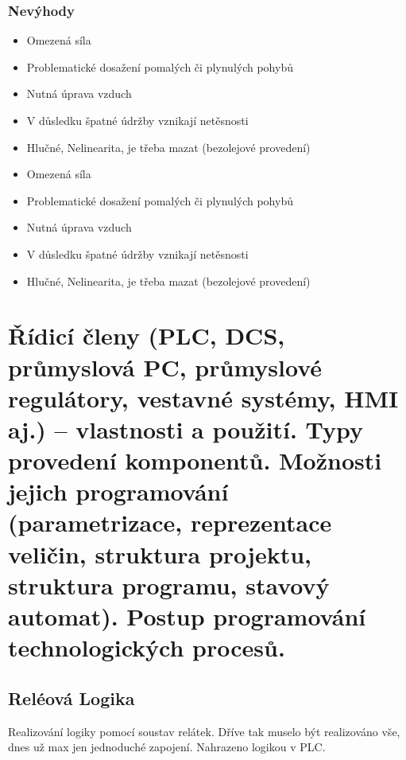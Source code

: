 \subsubsection*{Nevýhody}
\begin{itemize}
  \item Omezená síla
  \item Problematické dosažení pomalých či plynulých pohybů
  \item Nutná úprava vzduch
  \item V důsledku špatné údržby vznikají netěsnosti
  \item Hlučné, Nelinearita, je třeba mazat (bezolejové provedení)
    \item Omezená síla
    \item Problematické dosažení pomalých či plynulých pohybů
    \item Nutná úprava vzduch
    \item V důsledku špatné údržby vznikají netěsnosti
    \item Hlučné, Nelinearita, je třeba mazat (bezolejové provedení)
\end{itemize}

\section{Řídicí členy (PLC, DCS, průmyslová PC, průmyslové regulátory, vestavné systémy, HMI aj.) – vlastnosti a použití. Typy provedení komponentů. Možnosti jejich programování (parametrizace, reprezentace veličin, struktura projektu, struktura programu, stavový automat). Postup programování technologických procesů.}

\subsection{Reléová Logika}
Realizování logiky pomocí soustav relátek. Dříve tak muselo být realizováno vše, dnes už max jen jednoduché zapojení. Nahrazeno logikou v PLC.

